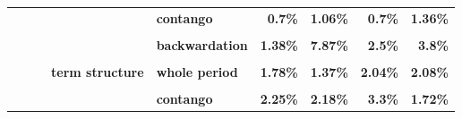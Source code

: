 \documentclass[
  authoryear,
  preprint,
  3p]{elsarticle}
\begin{document}
\begin{landscape}
\begin{longtable}[t]{>{}l>{}l>{}l>{}l>{}l>{}r>{}r>{}r>{}r}
\textbf{} & \textbf{} & \textbf{} & \textbf{} & \textbf{contango} & \textcolor[HTML]{4285f4}{\textbf{0.7\%}} & \textcolor[HTML]{4285f4}{\textbf{1.06\%}} & \textcolor[HTML]{4285f4}{\textbf{0.7\%}} & \textcolor[HTML]{4285f4}{\textbf{1.36\%}}\\
\textbf{\cellcolor{gray!10}{}} & \textbf{\cellcolor{gray!10}{}} & \textbf{\cellcolor{gray!10}{}} & \textbf{\cellcolor{gray!10}{open interest}} & \textbf{\cellcolor{gray!10}{whole period}} & \textcolor[HTML]{4285f4}{\textbf{\cellcolor{gray!10}{2.22\%}}} & \textcolor[HTML]{4285f4}{\textbf{\cellcolor{gray!10}{4.18\%}}} & \textcolor[HTML]{4285f4}{\textbf{\cellcolor{gray!10}{0.67\%}}} & \textcolor[HTML]{4285f4}{\textbf{\cellcolor{gray!10}{2.04\%}}}\\
\textbf{} & \textbf{} & \textbf{} & \textbf{} & \textbf{backwardation} & \textcolor[HTML]{4285f4}{\textbf{1.38\%}} & \textcolor[HTML]{4285f4}{\textbf{7.87\%}} & \textcolor[HTML]{4285f4}{\textbf{2.5\%}} & \textcolor[HTML]{4285f4}{\textbf{3.8\%}}\\
\textbf{\cellcolor{gray!10}{}} & \textbf{\cellcolor{gray!10}{}} & \textbf{\cellcolor{gray!10}{}} & \textbf{\cellcolor{gray!10}{}} & \textbf{\cellcolor{gray!10}{contango}} & \textcolor[HTML]{4285f4}{\textbf{\cellcolor{gray!10}{3.3\%}}} & \textcolor[HTML]{4285f4}{\textbf{\cellcolor{gray!10}{1.92\%}}} & \textcolor[HTML]{4285f4}{\textbf{\cellcolor{gray!10}{0.69\%}}} & \textcolor[HTML]{4285f4}{\textbf{\cellcolor{gray!10}{1.24\%}}}\\
\addlinespace
\textbf{} & \textbf{} & \textbf{} & \textbf{term structure} & \textbf{whole period} & \textcolor[HTML]{4285f4}{\textbf{1.78\%}} & \textcolor[HTML]{4285f4}{\textbf{1.37\%}} & \textcolor[HTML]{4285f4}{\textbf{2.04\%}} & \textcolor[HTML]{4285f4}{\textbf{2.08\%}}\\
\textbf{\cellcolor{gray!10}{}} & \textbf{\cellcolor{gray!10}{}} & \textbf{\cellcolor{gray!10}{}} & \textbf{\cellcolor{gray!10}{}} & \textbf{\cellcolor{gray!10}{backwardation}} & \textcolor[HTML]{4285f4}{\textbf{\cellcolor{gray!10}{1.47\%}}} & \textcolor[HTML]{4285f4}{\textbf{\cellcolor{gray!10}{1.19\%}}} & \textcolor[HTML]{4285f4}{\textbf{\cellcolor{gray!10}{1.87\%}}} & \textcolor[HTML]{4285f4}{\textbf{\cellcolor{gray!10}{3.56\%}}}\\
\textbf{} & \textbf{} & \textbf{} & \textbf{} & \textbf{contango} & \textcolor[HTML]{4285f4}{\textbf{2.25\%}} & \textcolor[HTML]{4285f4}{\textbf{2.18\%}} & \textcolor[HTML]{4285f4}{\textbf{3.3\%}} & \textcolor[HTML]{4285f4}{\textbf{1.72\%}}\\

\end{longtable}
\end{landscape}
\end{document}
